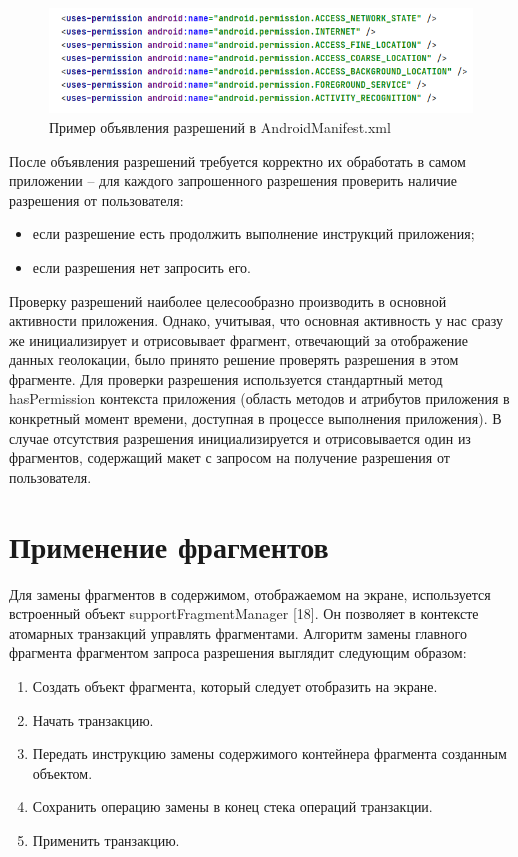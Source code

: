 \begin{figure}[H]
	\centering
	\includegraphics[width=\textwidth]{flesh/somefunc/manifest_permissions.png}
	\caption{\label{fig:manifest_permissions}Пример объявления разрешений в AndroidManifest.xml}
\end{figure}


После объявления разрешений требуется корректно их обработать в самом приложении – для каждого запрошенного разрешения проверить наличие разрешения от пользователя:
\begin{itemize}
	\item если разрешение есть \textendash\space продолжить выполнение инструкций приложения;
	\item если разрешения нет \textendash\space запросить его.
\end{itemize}


Проверку разрешений наиболее целесообразно производить в основной активности приложения. Однако, учитывая, что основная активность у нас сразу же инициализирует и отрисовывает фрагмент, отвечающий за отображение данных геолокации, было принято решение проверять разрешения в этом фрагменте.
Для проверки разрешения используется стандартный метод hasPermission контекста приложения (область методов и атрибутов приложения в конкретный момент времени, доступная в процессе выполнения приложения). 
В случае отсутствия разрешения инициализируется и отрисовывается один из фрагментов, содержащий макет с запросом на получение разрешения от пользователя. 

\section{Применение фрагментов}
Для замены фрагментов в содержимом, отображаемом на экране, используется встроенный объект supportFragmentManager [18]. Он позволяет в контексте атомарных транзакций управлять фрагментами. Алгоритм замены главного фрагмента фрагментом запроса разрешения выглядит следующим образом:
\begin{enumerate}
	\item Создать объект фрагмента, который следует отобразить на экране.
	\item Начать транзакцию.
	\item Передать инструкцию замены содержимого контейнера фрагмента созданным объектом.
	\item Сохранить операцию замены в конец стека операций транзакции.
	\item Применить транзакцию.
\end{enumerate}


